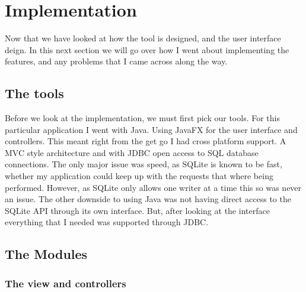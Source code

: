 \section{Implementation}
\label{sec:implementation}

Now that we have looked at how the tool is designed, and the user interface deign. In this next section we will go over how I went about implementing the features, and any problems that I came across along the way.   

\subsection{The tools}
\label{subsec:the_tools}

Before we look at the implementation, we must first pick our tools. For this particular application I went with Java. Using JavaFX for the user interface and controllers. This meant right from the get go I had cross platform support. A MVC style architecture and with JDBC open access to SQL database connections. The only major issue was speed, as SQLite is known to be fast, whether my application could keep up with the requests that where being performed. However, as SQLite only allows one writer at a time this so was never an issue. The other downside to using Java was not having direct access to the SQLite API through its own interface. But, after looking at the interface everything that I needed was supported through JDBC.

\subsection{The Modules}
\label{subsec:the_modules}

\subsubsection{The view and controllers}
\label{subsubsec:imp_veiw}

